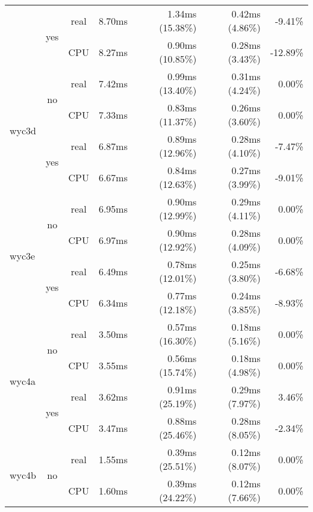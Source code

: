 \documentclass[en]{pracamgr}
\begin{document}
\begin{appendices}
\begin{small}
\begin{longtable}{|l|c|c|r|r|r|r|}
                          \cline{2-7}
                          & \multirow{2}{*}{yes} & real & 8.70ms & 1.34ms (15.38\%) & 0.42ms (4.86\%) & -9.41\% \\*
                          &                      & CPU  & 8.27ms & 0.90ms (10.85\%) & 0.28ms (3.43\%) & -12.89\% \\
\hline
\multirow{4}{*}{wyc3d}    & \multirow{2}{*}{no}  & real & 7.42ms & 0.99ms (13.40\%) & 0.31ms (4.24\%) & 0.00\% \\*
                          &                      & CPU  & 7.33ms & 0.83ms (11.37\%) & 0.26ms (3.60\%) & 0.00\% \\*
                          \cline{2-7}
                          & \multirow{2}{*}{yes} & real & 6.87ms & 0.89ms (12.96\%) & 0.28ms (4.10\%) & -7.47\% \\*
                          &                      & CPU  & 6.67ms & 0.84ms (12.63\%) & 0.27ms (3.99\%) & -9.01\% \\
\hline
\multirow{4}{*}{wyc3e}    & \multirow{2}{*}{no}  & real & 6.95ms & 0.90ms (12.99\%) & 0.29ms (4.11\%) & 0.00\% \\*
                          &                      & CPU  & 6.97ms & 0.90ms (12.92\%) & 0.28ms (4.09\%) & 0.00\% \\*
                          \cline{2-7}
                          & \multirow{2}{*}{yes} & real & 6.49ms & 0.78ms (12.01\%) & 0.25ms (3.80\%) & -6.68\% \\*
                          &                      & CPU  & 6.34ms & 0.77ms (12.18\%) & 0.24ms (3.85\%) & -8.93\% \\
\hline
\multirow{4}{*}{wyc4a}    & \multirow{2}{*}{no}  & real & 3.50ms & 0.57ms (16.30\%) & 0.18ms (5.16\%) & 0.00\% \\*
                          &                      & CPU  & 3.55ms & 0.56ms (15.74\%) & 0.18ms (4.98\%) & 0.00\% \\*
                          \cline{2-7}
                          & \multirow{2}{*}{yes} & real & 3.62ms & 0.91ms (25.19\%) & 0.29ms (7.97\%) & 3.46\% \\*
                          &                      & CPU  & 3.47ms & 0.88ms (25.46\%) & 0.28ms (8.05\%) & -2.34\% \\
\hline
\multirow{4}{*}{wyc4b}    & \multirow{2}{*}{no}  & real & 1.55ms & 0.39ms (25.51\%) & 0.12ms (8.07\%) & 0.00\% \\*
                          &                      & CPU  & 1.60ms & 0.39ms (24.22\%) & 0.12ms (7.66\%) & 0.00\% \\*

\end{longtable}
\end{small}
\end{appendices}
\end{document}
